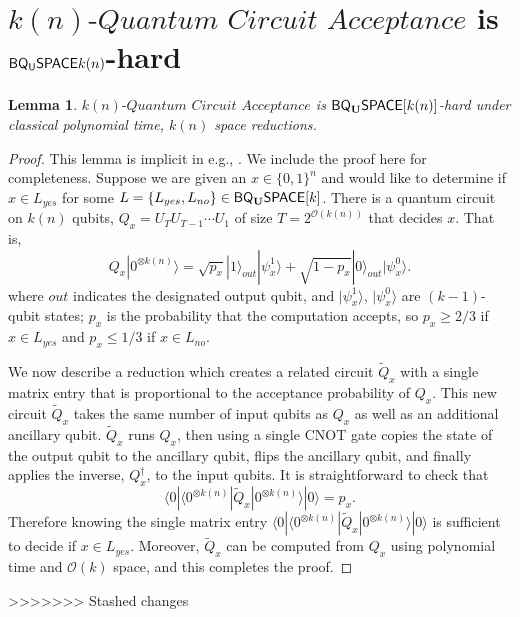 \documentclass[11pt]{article}
\newtheorem{lemma}{Lemma}
\theoremstyle{definition}
\theoremstyle{remark}
\theoremstyle{definition}
\newcommand\BQSPACE{{\sf{BQ_{U}SPACE}}}
\newcommand\qca[1]{#1\textit{-Quantum Circuit Acceptance}}
\newcommand{\zero}{\ensuremath{0^{\otimes{k(n)}}}}
\newcommand{\classfont}{\sf}
\newcommand{\Unitary}{\mathbf{U}}
\newcommand{\unitaryBQSPACE}[1]{{\classfont{BQ}_\Unitary\classfont{SPACE}}[#1]}
\begin{document}
\section{$\qca{k(n)}$ is $\BQSPACE{k(n)}$-hard}\label{app:qca}
\begin{lemma}
	$\qca{k(n)}$ is $\unitaryBQSPACE{k(n)}$-hard under classical polynomial time, $k(n)$ space reductions.
\end{lemma}
\begin{proof}This lemma is implicit in e.g., \cite{bbbv,dawsonnielsen}.  We include the proof here for completeness.  Suppose we are given an $x\in \{0,1\}^n$ and would like to determine if $x\in L_{yes}$ for some $L=\{L_{yes},L_{no}\}\in\unitaryBQSPACE{k}$.  There is a quantum circuit on $k(n)$ qubits, $Q_x=U_TU_{T-1}\cdots U_1$ of size $T=2^{\mathcal{O}(k(n))}$ that decides $x$.  That is, 
\begin{equation}
Q_x|\zero\rangle = \sqrt{p_x} |1\rangle_{out}|\psi_x^1\rangle + \sqrt{1-p_x} |0\rangle_{out} |\psi_x^0\rangle.
\end{equation}
where $out$ indicates the designated output qubit, and $|\psi_x^1\rangle$, $|\psi_x^0\rangle$ are $(k-1)$-qubit states; $p_x$ is the probability that the computation accepts, so $p_x \ge 2/3$ if $x \in L_{yes}$ and $p_x \le 1/3$ if $x \in L_{no}$.

We now describe a reduction which creates a related circuit $\tilde{Q}_x$ with a single matrix entry that is proportional to the acceptance probability of $Q_x$.  This new circuit $\tilde{Q}_x$ takes the same number of input qubits as $Q_x$ as well as an additional ancillary qubit.  $\tilde{Q}_x$ runs $Q_x$, then using a single CNOT gate copies the state of the output qubit to the ancillary qubit, flips the ancillary qubit, and finally applies the inverse, $Q_x^{\dagger}$, to the input qubits. It is straightforward to check that
\begin{equation}
\langle 0|\langle \zero|\tilde{Q}_x|\zero\rangle|0\rangle = p_x.
\end{equation}
Therefore knowing the single matrix entry $\langle 0|\langle \zero|\tilde{Q}_x|\zero\rangle|0\rangle$ is sufficient to decide if $x \in L_{yes}$. Moreover, $\tilde{Q}_x$ can be computed from $Q_x$ using polynomial time and $\mathcal{O}(k)$ space, and this completes the proof.
\end{proof}

>>>>>>> Stashed changes
\end{document}
